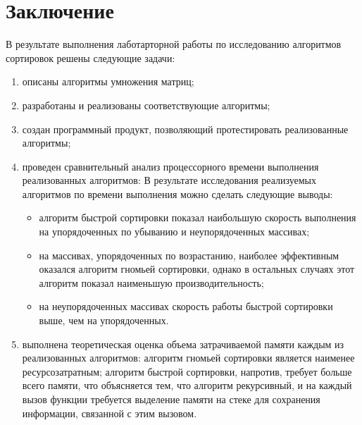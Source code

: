 \chapter*{Заключение}

В результате выполнения лаботарторной работы по исследованию алгоритмов сортировок решены следующие задачи:
\begin{enumerate}
    \item описаны алгоритмы умножения матриц;
    \item разработаны и реализованы соответствующие алгоритмы;
    \item создан программный продукт, позволяющий протестировать реализованные алгоритмы;
    \item проведен сравнительный анализ процессорного времени выполнения реализованных алгоритмов:
    В результате исследования реализуемых алгоритмов по времени выполнения можно сделать следующие выводы:
    \begin{itemize}
        \item алгоритм быстрой сортировки показал наибольшую скорость выполнения на упорядоченных по убыванию и неупорядоченных массивах;
        \item на массивах, упорядоченных по возрастанию, наиболее эффективным оказался алгоритм гномьей сортировки, однако в остальных случаях этот алгоритм показал наименьшую производительность;
        \item на неупорядоченных массивах скорость работы быстрой сортировки выше, чем на упорядоченных.
    \end{itemize}
    \item выполнена теоретическая оценка объема затрачиваемой памяти каждым из реализованных алгоритмов: алгоритм гномьей сортировки является наименее ресурсозатратным;
    алгоритм быстрой сортировки, напротив, требует больше всего памяти, что объясняется тем, что алгоритм рекурсивный, и на каждый вызов функции требуется выделение памяти на стеке для сохранения информации, связанной с этим вызовом.
\end{enumerate}